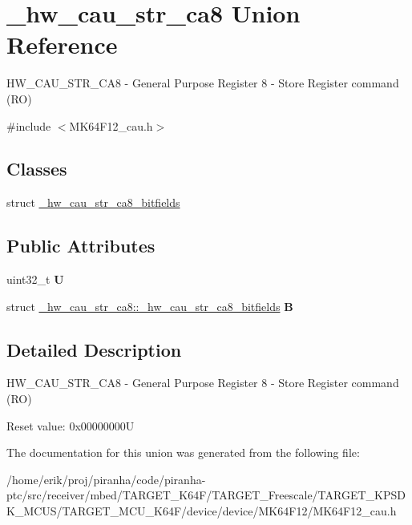 \hypertarget{union__hw__cau__str__ca8}{}\section{\+\_\+hw\+\_\+cau\+\_\+str\+\_\+ca8 Union Reference}
\label{union__hw__cau__str__ca8}


H\+W\+\_\+\+C\+A\+U\+\_\+\+S\+T\+R\+\_\+\+C\+A8 -\/ General Purpose Register 8 -\/ Store Register command (RO)  




{\ttfamily \#include $<$M\+K64\+F12\+\_\+cau.\+h$>$}

\subsection*{Classes}
\begin{DoxyCompactItemize}
\item 
struct \hyperlink{struct__hw__cau__str__ca8_1_1__hw__cau__str__ca8__bitfields}{\+\_\+hw\+\_\+cau\+\_\+str\+\_\+ca8\+\_\+bitfields}
\end{DoxyCompactItemize}
\subsection*{Public Attributes}
\begin{DoxyCompactItemize}
\item 
uint32\+\_\+t {\bfseries U}\hypertarget{union__hw__cau__str__ca8_a4352f640d7bb27a1b2e682939e94f1ef}{}\label{union__hw__cau__str__ca8_a4352f640d7bb27a1b2e682939e94f1ef}

\item 
struct \hyperlink{struct__hw__cau__str__ca8_1_1__hw__cau__str__ca8__bitfields}{\+\_\+hw\+\_\+cau\+\_\+str\+\_\+ca8\+::\+\_\+hw\+\_\+cau\+\_\+str\+\_\+ca8\+\_\+bitfields} {\bfseries B}\hypertarget{union__hw__cau__str__ca8_a93271051611f377822fafbf2705d450b}{}\label{union__hw__cau__str__ca8_a93271051611f377822fafbf2705d450b}

\end{DoxyCompactItemize}


\subsection{Detailed Description}
H\+W\+\_\+\+C\+A\+U\+\_\+\+S\+T\+R\+\_\+\+C\+A8 -\/ General Purpose Register 8 -\/ Store Register command (RO) 

Reset value\+: 0x00000000U 

The documentation for this union was generated from the following file\+:\begin{DoxyCompactItemize}
\item 
/home/erik/proj/piranha/code/piranha-\/ptc/src/receiver/mbed/\+T\+A\+R\+G\+E\+T\+\_\+\+K64\+F/\+T\+A\+R\+G\+E\+T\+\_\+\+Freescale/\+T\+A\+R\+G\+E\+T\+\_\+\+K\+P\+S\+D\+K\+\_\+\+M\+C\+U\+S/\+T\+A\+R\+G\+E\+T\+\_\+\+M\+C\+U\+\_\+\+K64\+F/device/device/\+M\+K64\+F12/M\+K64\+F12\+\_\+cau.\+h\end{DoxyCompactItemize}
